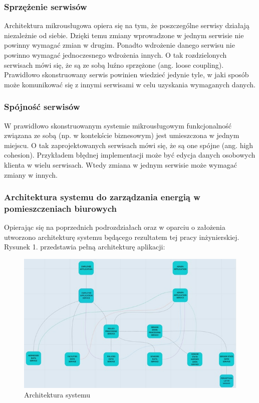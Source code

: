 \documentclass[11pt, a4]{article} %
\begin{document}
\subsubsection{Sprzężenie serwisów}

Architektura mikrousługowa opiera się na tym, że poszczególne serwisy działają 
niezależnie od siebie. Dzięki temu zmiany wprowadzone w jednym serwisie nie powinny 
wymagać zmian w drugim. Ponadto wdrożenie danego serwisu nie powinno wymagać 
jednoczesnego wdrożenia innych. O tak rozdzielonych serwisach mówi się, że są ze sobą 
luźno sprzężone (ang. loose coupling). Prawidłowo skonstruowany serwis powinien 
wiedzieć jedynie tyle, w jaki sposób może komunikować się z innymi serwisami w celu 
uzyskania wymaganych danych.

\subsubsection{Spójność serwisów}
W prawidłowo skonstruowanym systemie mikrousługowym funkcjonalność związana ze 
sobą (np. w kontekście biznesowym) jest umieszczona w jednym miejscu. O tak 
zaprojektowanych serwisach mówi się, że są one spójne (ang. high cohesion). Przykładem 
błędnej implementacji może być edycja danych osobowych klienta w wielu serwisach. 
Wtedy zmiana w jednym serwisie może wymagać zmiany w innych.

\subsubsection{Architektura systemu do zarządzania energią w pomieszczeniach biurowych}

Opierając się na poprzednich podrozdziałach oraz w oparciu o założenia utworzono 
architekturę systemu będącego rezultatem tej pracy inżynierskiej. Rysunek 1. 
przedstawia pełną architekturę aplikacji:

\begin{figure}[h] %
    \centering %
    \includegraphics[width=1\textwidth]{architektura.jpg} %
    \caption{Architektura systemu} %
    \label{fig:architektura-systemu} %
\end{figure}
\end{document}
